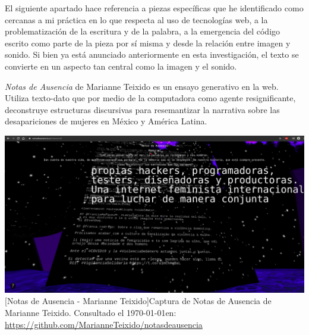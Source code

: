 
El siguiente apartado hace referencia a piezas específicas que he identificado como cercanas a mi práctica en lo que respecta al uso de tecnologías web, a la problematización de la escritura y de la palabra, a la emergencia del código escrito como parte de la pieza por sí misma y desde la relación entre imagen y sonido. Si bien ya está anunciado anteriormente en esta investigación, el texto se convierte en un aspecto tan central como la imagen y el sonido. 

\emph{Notas de Ausencia} de Marianne Teixido es un ensayo generativo en la web. Utiliza texto-dato que por medio de la computadora como agente resignificante, deconstruye estructuras discursivas para resemantizar la narrativa sobre las desapariciones de mujeres en México y América Latina.


\begin{Figure} 
\includegraphics[width=\columnwidth]{../img/notas02.png} 
[Notas de Ausencia - Marianne Teixido]{Captura de Notas de Ausencia de Marianne Teixido. Consultado el \today en: \url{https://github.com/MarianneTeixido/notasdeausencia}} %
\label{fig:gallery} 
\end{Figure}

  
